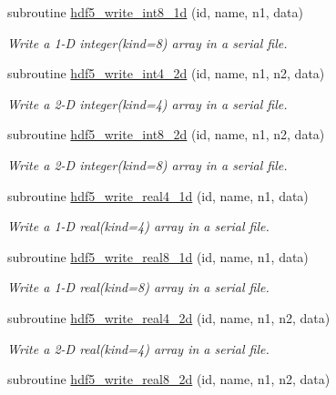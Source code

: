 \begin{DoxyCompactItemize}
subroutine \hyperlink{namespacemodhdf5_af39615b3539b84afc3890884aafec217}{hdf5\+\_\+write\+\_\+int8\+\_\+1d} (id, name, n1, data)
\begin{DoxyCompactList}\small\item\em Write a 1-\/D integer(kind=8) array in a serial file. \end{DoxyCompactList}\item 
subroutine \hyperlink{namespacemodhdf5_ab39fa5690f5f029a8beea46dd8030b1d}{hdf5\+\_\+write\+\_\+int4\+\_\+2d} (id, name, n1, n2, data)
\begin{DoxyCompactList}\small\item\em Write a 2-\/D integer(kind=4) array in a serial file. \end{DoxyCompactList}\item 
subroutine \hyperlink{namespacemodhdf5_abcc24e701a795a92f16c6d4c1eb034c7}{hdf5\+\_\+write\+\_\+int8\+\_\+2d} (id, name, n1, n2, data)
\begin{DoxyCompactList}\small\item\em Write a 2-\/D integer(kind=8) array in a serial file. \end{DoxyCompactList}\item 
subroutine \hyperlink{namespacemodhdf5_a5f075a274076e480eee835fd3b9573af}{hdf5\+\_\+write\+\_\+real4\+\_\+1d} (id, name, n1, data)
\begin{DoxyCompactList}\small\item\em Write a 1-\/D real(kind=4) array in a serial file. \end{DoxyCompactList}\item 
subroutine \hyperlink{namespacemodhdf5_aed41c10954f7cb054d46df0c012d147d}{hdf5\+\_\+write\+\_\+real8\+\_\+1d} (id, name, n1, data)
\begin{DoxyCompactList}\small\item\em Write a 1-\/D real(kind=8) array in a serial file. \end{DoxyCompactList}\item 
subroutine \hyperlink{namespacemodhdf5_a71a612d3c6bc8959576fe46d7bab679f}{hdf5\+\_\+write\+\_\+real4\+\_\+2d} (id, name, n1, n2, data)
\begin{DoxyCompactList}\small\item\em Write a 2-\/D real(kind=4) array in a serial file. \end{DoxyCompactList}\item 
subroutine \hyperlink{namespacemodhdf5_a86d263896481bcb679282cede10ab4a1}{hdf5\+\_\+write\+\_\+real8\+\_\+2d} (id, name, n1, n2, data)

\end{DoxyCompactItemize}
